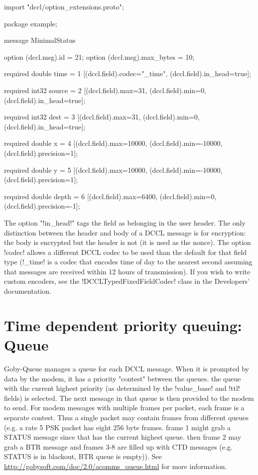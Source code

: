 \begin{boxedverbatim}
import "dccl/option_extensions.proto";

package example;

message MinimalStatus
{ 
  option (dccl.msg).id = 21;
  option (dccl.msg).max_bytes = 10;

  required double time = 1 [(dccl.field).codec="_time",
                            (dccl.field).in_head=true];
  
  required int32 source = 2 [(dccl.field).max=31,
                             (dccl.field).min=0,
                             (dccl.field).in_head=true];

  required int32 dest = 3 [(dccl.field).max=31,
                           (dccl.field).min=0,
                           (dccl.field).in_head=true];
  
  required double x = 4 [(dccl.field).max=10000,
                         (dccl.field).min=-10000,
                         (dccl.field).precision=1];
  
  required double y = 5 [(dccl.field).max=10000,
                         (dccl.field).min=-10000,
                         (dccl.field).precision=1];
  
  required double depth = 6 [(dccl.field).max=6400,
                             (dccl.field).min=0,
                             (dccl.field).precision=-1];
} 
\end{boxedverbatim}
\resetbvlinenumber

The option "!in_head!" tags the field as belonging in the user header. The only distinction between the header and body of a DCCL message is for encryption: the body is encrypted but the header is not (it is used as the nonce). The option !codec! allows a different DCCL codec to be used than the default for that field type (!_time! is a codec that encodes time of day to the nearest second assuming that messages are received within 12 hours of transmission). If you wish to write custom encoders, see the !DCCLTypedFixedFieldCodec! class in the Developers' documentation.

\section{Time dependent priority queuing: Queue} \label{sec:queue}

Goby-Queue manages a queue for each DCCL message. When it is prompted by data by the modem, it has a priority "contest" between the queues. the queue with the current highest priority (as determined by the !value_base! and !ttl! fields) is selected. The next message in that queue is then provided to the modem to send. For modem messages with multiple frames per packet, each frame is a separate contest. Thus a single packet may contain frames from different
 queues (e.g. a rate 5 PSK packet has eight 256 byte frames. frame 1 might grab a STATUS message since that has the current highest queue. then frame 2 may grab a BTR message and frames 3-8 are filled up with CTD messages (e.g. STATUS is in blackout, BTR queue is empty)). See \url{http://gobysoft.com/doc/2.0/acomms_queue.html} for more information.

